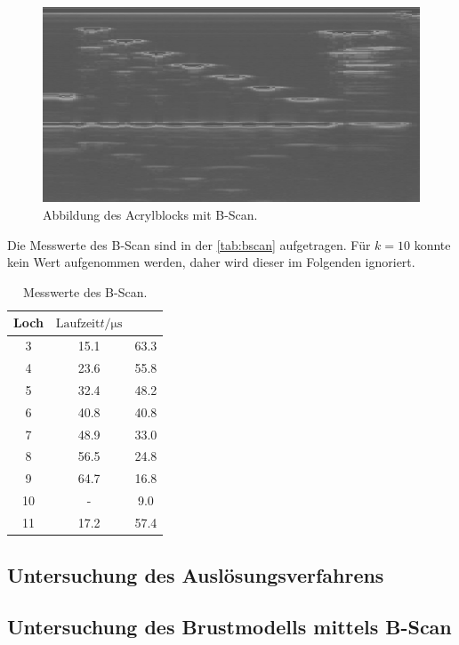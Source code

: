 \begin{figure}[H]
    \centering
	\includegraphics[width=0.8\linewidth]{data/US1_daten/b_scan_u.jpg}
    \captionsetup{width=0.765\linewidth}
	\caption{Abbildung des Acrylblocks mit B-Scan.}
	\label{fig:unten}
\end{figure}

Die Messwerte des B-Scan sind in der \autoref{tab:bscan} aufgetragen. Für $k =10$ konnte kein Wert aufgenommen werden, daher wird dieser
im Folgenden ignoriert.
\begin{table}[H]
    \centering
    \caption{Messwerte des B-Scan.}
    \label{tab:bscan}
\begin{tabular}{c c c}
\toprule
Loch & $\text{Laufzeit} t / \si{\micro\second} $\\
\midrule
 3 & 15.1 & 63.3 \\
 4 & 23.6 & 55.8 \\
 5 & 32.4 & 48.2 \\
 6 & 40.8 & 40.8 \\
 7 & 48.9 & 33.0 \\
 8 & 56.5 & 24.8 \\
 9 & 64.7 & 16.8 \\
10 & - &  9.0 \\
11 & 17.2 & 57.4 \\
\bottomrule
\end{tabular}
\end{table}

\subsection{Untersuchung des Auslösungsverfahrens} %
\label{sec:Untersuchung des Auslösungsverfahrens}


\subsection{Untersuchung des Brustmodells mittels B-Scan}
\label{sec:Untersuchung des Brustmodells mittels B-Scan}